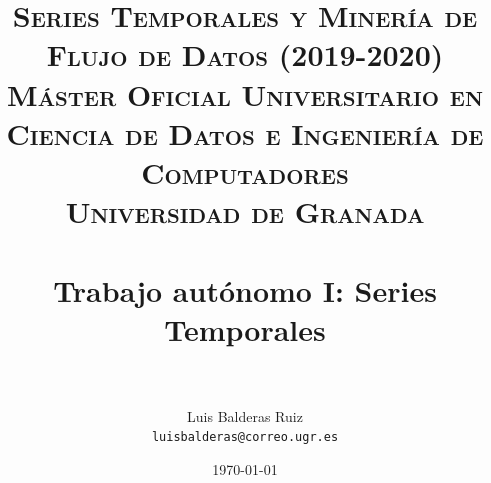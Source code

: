 
\graphicspath{ {./images/} }
\usepackage{subcaption}
\usepackage{hyperref}
\usepackage{soul}



\title{	
\normalfont \normalsize 
\textsc{\textbf{Series Temporales y Minería de Flujo de Datos (2019-2020)} \\ Máster Oficial Universitario en Ciencia de Datos e Ingeniería de Computadores \\ Universidad de Granada} \\ [25pt] %
\horrule{0.5pt} \\[0.4cm] %
\huge Trabajo autónomo I: Series Temporales \\ %
\horrule{2pt} \\[0.5cm] %
}

\author{Luis Balderas Ruiz \\ \texttt{luisbalderas@correo.ugr.es}} 


\date{\normalsize\today} %




\maketitle %

\newpage %

\tableofcontents %

\listoffigures

\listoftables

\newpage

%

